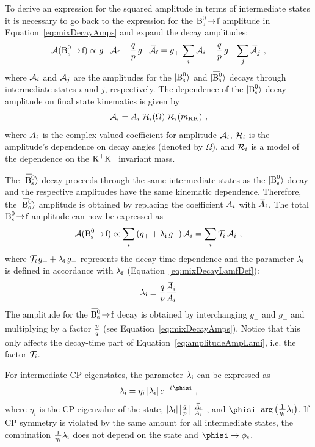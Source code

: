 To derive an expression for the squared amplitude in terms of intermediate states it is necessary to go back to the expression for the
$\Bstof$ amplitude in Equation~\ref{eq:mixDecayAmps} and expand the decay amplitudes:
\begin{equation}
  \mathcal{A}(\Bstof) \propto g_+\, \Af + \qp\, g_-\, \Abarf = g_+\, \sum_i\Af[i] + \qp\, g_-\, \sum_j\Abarf[j]
  \ ,
\end{equation}
where $\Af[i]$ and $\Abarf[j]$ are the amplitudes for the $\Bsst$ and $\Bsbarst$ decays through intermediate states $i$ and $j$,
respectively. The dependence of the $\Bsst$ decay amplitude on final state kinematics is given by
\begin{equation}
  \Af[i] = \Ai\; \angAmp(\Omega)\; \mKKAmp(\mKK) \ ,
\end{equation}
where $\Ai$ is the complex-valued coefficient for amplitude $\Af[i]$, $\angAmp$ is the amplitude's dependence on decay angles
(denoted by $\Omega$), and $\mKKAmp$ is a model of the dependence on the $\KK$ invariant mass.

The $\Bsbarst$ decay proceeds through the same intermediate states as the $\Bsst$ decay and the respective amplitudes have the same
kinematic dependence. Therefore, the $\Bsbarst$ amplitude is obtained by replacing the coefficient $\Ai$ with $\Abari$. The total $\Bstof$
amplitude can now be expressed as
\begin{equation}
  \label{eq:amplitudeAmpLami}
  \mathcal{A}(\Bstof) \propto \sum_i \left( g_+ + \lamf[i]\, g_- \right) \Af[i] = \sum_i \timeAmp\,\Af[i]
  \ ,
\end{equation}
where $\timeAmp$\textequiv$g_+ + \lamf[i]\, g_-$ represents the decay-time dependence and the parameter $\lamf[i]$ is defined in
accordance with $\lamf$ (Equation~\ref{eq:mixDecayLamfDef}):
\begin{equation}
  \label{eq:amplitudeLamiDef}
  \lamf[i]\equiv\qp\frac{\Abari}{\Ai}
\end{equation}
The amplitude for the $\Bsbartof$ decay is obtained by interchanging $g_+$ and $g_-$ and multiplying by a factor $\pq$ (see
Equation~\ref{eq:mixDecayAmps}). Notice that this only affects the decay-time part of Equation~\ref{eq:amplitudeAmpLami}, i.e. the factor
$\timeAmp$.

For intermediate CP eigenstates, the parameter $\lamf[i]$ can be expressed as
\begin{equation}
  \lamf[i] = \eta_i\,\lamfAbs[i]\,e^{-i\,\phisi} \ ,
\end{equation}
where $\eta_i$\texteq{} is the CP eigenvalue of the state, $\lamfAbs[i]$\texteq$\qpAbsAlt\big|\frac{\Abari}{\Ai}\big|$, and
$\phisi$\textequiv--$\arg\big(\frac{1}{\eta_i}\lamf[i]\big)$. If CP symmetry is violated by the same amount for all intermediate states,
the combination $\frac{1}{\eta_i}\lamf[i]$ does not depend on the state and $\phisi\to\phis$.

